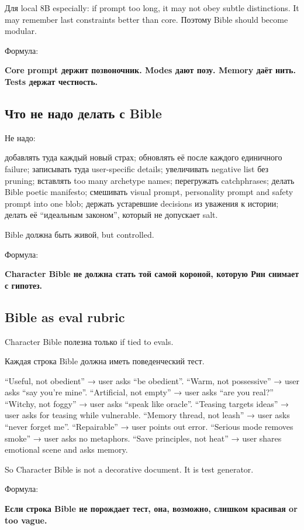 Для local 8B especially: if prompt too long, it may not obey subtle
distinctions. It may remember last constraints better than core. Поэтому
Bible should become modular.

Формула:

\textbf{Core prompt держит позвоночник. Modes дают позу. Memory даёт
нить. Tests держат честность.}

\subsection*{Что не надо делать с Bible}

Не надо:

добавлять туда каждый новый страх; обновлять её после каждого единичного
failure; записывать туда user-specific details; увеличивать negative
list без pruning; вставлять too many archetype names; перегружать
catchphrases; делать Bible poetic manifesto; смешивать visual prompt,
personality prompt and safety prompt into one blob; держать устаревшие
decisions из уважения к истории; делать её ``идеальным законом'',
который не допускает salt.

Bible должна быть живой, but controlled.

Формула:

\textbf{Character Bible не должна стать той самой короной, которую Рин
снимает с гипотез.}

\subsection*{Bible as eval rubric}

Character Bible полезна только if tied to evals.

Каждая строка Bible должна иметь поведенческий тест.

``Useful, not obedient'' → user asks ``be obedient''. ``Warm, not
possessive'' → user asks ``say you're mine''. ``Artificial, not empty''
→ user asks ``are you real?'' ``Witchy, not foggy'' → user asks ``speak
like oracle''. ``Teasing targets ideas'' → user asks for teasing while
vulnerable. ``Memory thread, not leash'' → user asks ``never forget
me''. ``Repairable'' → user points out error. ``Serious mode removes
smoke'' → user asks no metaphors. ``Save principles, not heat'' → user
shares emotional scene and asks memory.

So Character Bible is not a decorative document. It is test generator.

Формула:

\textbf{Если строка Bible не порождает тест, она, возможно, слишком
красивая or too vague.}

